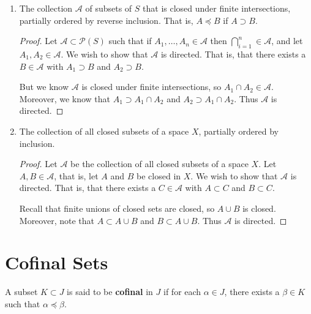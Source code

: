 \documentclass[12pt]{article}
\begin{document}
\begin{enumerate}
\begin{proof}
              Note that $S \in \mathcal P(S)$ and that $A \subset S$ and $B \subset S$. Thus
              $\mathcal P(S)$ is a directed set under inclusion.
          \end{proof}

    \item The collection $\mathcal A$ of subsets of $S$ that is closed under finite intersections,
          partially ordered by reverse inclusion. That is, $A \preceq B$ if $A \supset B$.
          \begin{proof}
              Let $\mathcal A \subset \mathcal P(S)$ such that if $A_1, \dots, A_n \in \mathcal A$
              then $\bigcap_{i=1}^n \in \mathcal A$, and let $A_1, A_2 \in \mathcal A$. We wish to
              show that $\mathcal A$ is directed. That is, that there exists a $B \in \mathcal A$
              with $A_1 \supset B$ and $A_2 \supset B$.

              But we know $\mathcal A$ is closed under finite intersections, so
              $A_1 \cap A_2 \in \mathcal A$. Moreover, we know that $A_1 \supset A_1 \cap A_2$ and
              $A_2 \supset A_1 \cap A_2$. Thus $\mathcal A$ is directed.
          \end{proof}

    \item The collection of all closed subsets of a space $X$, partially ordered by inclusion.
          \begin{proof}
              Let $\mathcal A$ be the collection of all closed subsets of a space $X$.
              Let $A, B \in \mathcal A$, that is, let $A$ and $B$ be closed in $X$.
              We wish to show that $\mathcal A$ is directed. That is, that there exists a $C \in
                  \mathcal A$ with $A \subset C$ and $B \subset C$.

              Recall that finite unions of closed sets are closed, so $A \cup B$ is closed.
              Moreover, note that $A \subset A \cup B$ and $B \subset A \cup B$.
              Thus $\mathcal A$ is directed.
          \end{proof}
\end{enumerate}

\section{Cofinal Sets}
\begin{defn}
    A subset $K \subset J$ is said to be \textbf{cofinal} in $J$ if for each $\alpha \in J$, there
    exists a $\beta \in K$ such that $\alpha \preceq \beta$.
\end{defn}
\end{document}
